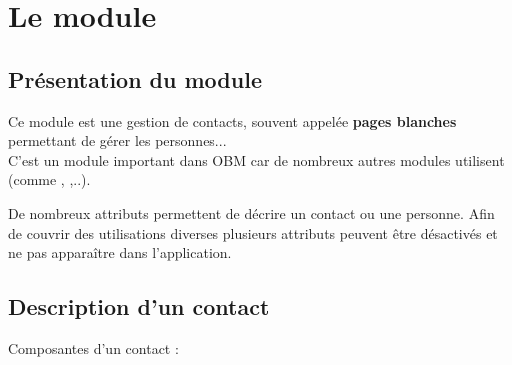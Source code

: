 
\clearpage
\section{Le module \contact}

\subsection{Présentation du module \contact}

Ce module est une gestion de contacts, souvent appelée \textbf{pages blanches} permettant de gérer les personnes...\\

C'est un module important dans OBM car de nombreux autres modules utilisent \contact (comme \company, \deal,..).

De nombreux attributs permettent de décrire un contact ou une personne.
Afin de couvrir des utilisations diverses plusieurs attributs peuvent être désactivés et ne pas apparaître dans l'application.

\subsection{Description d'un contact}

Composantes d'un contact :\\

